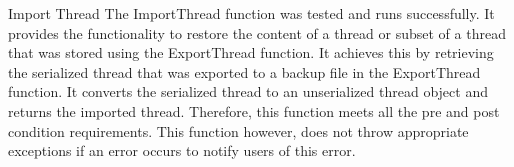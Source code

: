Import Thread
The ImportThread function was tested and runs successfully. It provides the functionality to restore the content of a thread or subset of a thread that was stored using the ExportThread function. It achieves this by retrieving the serialized thread that was exported to a backup file in the ExportThread function. It converts the serialized thread to an unserialized  thread object and returns the imported thread. Therefore, this function meets all the pre and post condition requirements. This function however, does not throw appropriate exceptions if an error occurs to notify users of this error.
 
